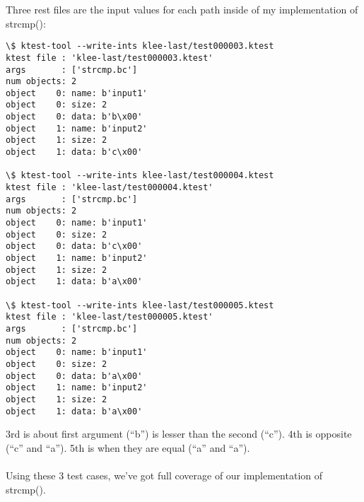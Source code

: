 Three rest files are the input values for each path inside of my implementation of strcmp():

\begin{lstlisting}
\$ ktest-tool --write-ints klee-last/test000003.ktest
ktest file : 'klee-last/test000003.ktest'
args       : ['strcmp.bc']
num objects: 2
object    0: name: b'input1'
object    0: size: 2
object    0: data: b'b\x00'
object    1: name: b'input2'
object    1: size: 2
object    1: data: b'c\x00'

\$ ktest-tool --write-ints klee-last/test000004.ktest
ktest file : 'klee-last/test000004.ktest'
args       : ['strcmp.bc']
num objects: 2
object    0: name: b'input1'
object    0: size: 2
object    0: data: b'c\x00'
object    1: name: b'input2'
object    1: size: 2
object    1: data: b'a\x00'

\$ ktest-tool --write-ints klee-last/test000005.ktest
ktest file : 'klee-last/test000005.ktest'
args       : ['strcmp.bc']
num objects: 2
object    0: name: b'input1'
object    0: size: 2
object    0: data: b'a\x00'
object    1: name: b'input2'
object    1: size: 2
object    1: data: b'a\x00'
\end{lstlisting}

3rd is about first argument (``b'') is lesser than the second (``c'').
4th is opposite (``c'' and ``a'').
5th is when they are equal (``a'' and ``a'').\\
\\
Using these 3 test cases, we've got full coverage of our implementation of strcmp().

